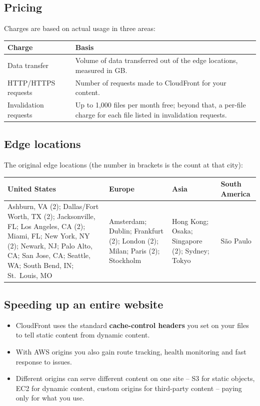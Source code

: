 \documentclass[11pt,a4paper]{article}
\begin{document}

\subsection{Pricing}

Charges are based on actual usage in three areas:

\begin{tabularx}{\textwidth}{@{}lX@{}}
\toprule
\rowcolor{tablehead}\textbf{Charge} & \textbf{Basis} \\
\midrule
Data transfer & Volume of data transferred out of the edge locations, measured in GB. \\
HTTP/HTTPS requests & Number of requests made to CloudFront for your content. \\
Invalidation requests & Up to 1,000 files per month free; beyond that, a per-file charge for
  each file listed in invalidation requests. \\
\bottomrule
\end{tabularx}

\subsection{Edge locations}

The original edge locations (the number in brackets is the count at that city):

\begin{tabularx}{\textwidth}{@{}XXXX@{}}
\toprule
\rowcolor{tablehead}\textbf{United States} & \textbf{Europe} & \textbf{Asia} &
  \textbf{South America} \\
\midrule
Ashburn, VA (2); Dallas/Fort Worth, TX (2); Jacksonville, FL; Los Angeles, CA (2); Miami, FL;
New York, NY (2); Newark, NJ; Palo Alto, CA; San Jose, CA; Seattle, WA; South Bend, IN;
St.\ Louis, MO &
Amsterdam; Dublin; Frankfurt (2); London (2); Milan; Paris (2); Stockholm &
Hong Kong; Osaka; Singapore (2); Sydney; Tokyo &
S\~ao Paulo \\
\bottomrule
\end{tabularx}

\subsection{Speeding up an entire website}

\begin{itemize}\itemsep2pt
  \item CloudFront uses the standard \textbf{cache-control headers} you set on your files to
        tell static content from dynamic content.
  \item With AWS origins you also gain route tracking, health monitoring and fast response to
        issues.
  \item Different origins can serve different content on one site -- S3 for static objects,
        EC2 for dynamic content, custom origins for third-party content -- paying only for
        what you use.
\end{itemize}
\end{document}
